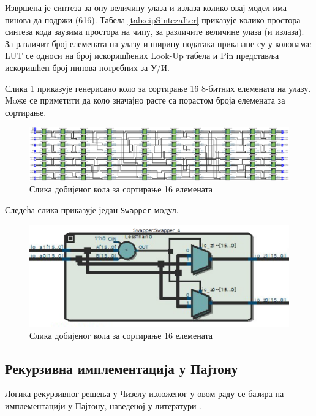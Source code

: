 \documentclass[12pt, a4paper]{article}
\theoremstyle{definition}
\begin{document}
Извршена је синтеза за ону величину улаза и излаза колико овај модел има пинова да подржи (616). Табела \ref{tab:cipSintezaIter} приказује колико простора синтеза кода заузима простора на чипу, за различите величине улаза (и излаза). За различит број елемената на улазу и ширину података приказане су у колонама: LUT се односи на број искоришћених Look-Up табела и Pin представља искоришћен број пинова потребних за У/И.

\newpage
Слика \ref{fig:RTL_Iter} приказује генерисано коло за сортирање 16 8-битних елемената на улазу. Moже се приметити да коло значајно расте са порастом броја елемената за сортирање.

\begin{figure}[H]
  \centering
      \includegraphics[scale=0.24]{slike/RTL_Iter_16_8.png}
  \caption{Слика добијеног кола за сортирање 16 елемената}
  \label{fig:RTL_Iter}
\end{figure}

Следећа слика приказује један \verb+Swapper+ модул.

\begin{figure}[H]
  \centering
      \includegraphics[scale=0.5]{slike/swapper.png}
  \caption{Слика добијеног кола за сортирање 16 елемената}
  \label{fig:swapper}
\end{figure}

\newpage
\subsection{Рекурзивна имплементација у Пајтону}

Логика рекурзивног решења у Чизелу изложеног у овом раду се базира на имплементацији у Пајтону, наведеној у литератури \cite{geeks}.
\end{document}
